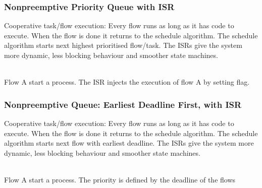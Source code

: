 \subsubsection{Nonpreemptive Priority Queue with ISR}
Cooperative task/flow execution: Every flow runs as long as it has code to execute.
When the flow is done it returns to the schedule algorithm.
The schedule algorithm starts next highest prioritised flow/task.
The ISRs give the system more dynamic, less blocking behaviour and smoother state machines.
\begin{paracol}{3}
  
  \switchcolumn
  
  \switchcolumn
  
\end{paracol}
\\
Flow A start a process.
The ISR injects the execution of flow A by setting flag.

\subsubsection{Nonpreemptive Queue: Earliest Deadline First, with ISR}
Cooperative task/flow execution: Every flow runs as long as it has code to execute.
When the flow is done it returns to the schedule algorithm.
The schedule algorithm starts next flow with earliest deadline.
The ISRs give the system more dynamic, less blocking behaviour and smoother state machines.
\begin{paracol}{3}
  
  \switchcolumn
  
  \switchcolumn
  
\end{paracol}
\\
Flow A start a process.
The priority is defined by the deadline of the flows

\subsubsection{}


